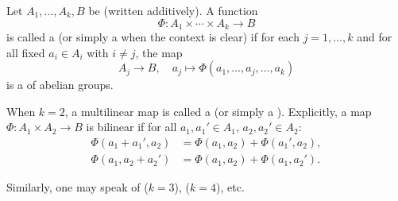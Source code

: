 \begin{definition} \label{definition:multilinear_map_of_abelian_groups}
Let $A_1, \ldots, A_k, B$ be  (written additively). A function
$$\Phi: A_1 \times \cdots \times A_k \to B$$
is called a  (or simply a  when the context is clear) if for each $j = 1, \ldots, k$ and for all fixed $a_i \in A_i$ with $i \neq j$, the map
$$A_j \to B, \quad a_j \mapsto \Phi(a_1, \ldots, a_j, \ldots, a_k)$$
is a  of abelian groups.

When $k = 2$, a multilinear map is called a  (or simply a ). Explicitly, a map $\Phi: A_1 \times A_2 \to B$ is bilinear if for all $a_1, a_1' \in A_1$, $a_2, a_2' \in A_2$:
\begin{align*}
\Phi(a_1 + a_1', a_2) &= \Phi(a_1, a_2) + \Phi(a_1', a_2), \\
\Phi(a_1, a_2 + a_2') &= \Phi(a_1, a_2) + \Phi(a_1, a_2').
\end{align*}


Similarly, one may speak of  ($k=3$),  ($k=4$), etc.
\end{definition}